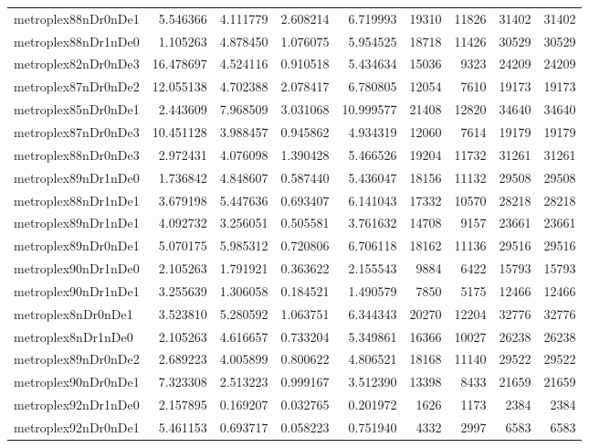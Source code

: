 \begin{longtable}{|l|r|r|r|r|r|r|r|r|}
metroplex88nDr0nDe1 & 5.546366 & 4.111779 & 2.608214 & 6.719993 & 19310 & 11826 & 31402 & 31402 \\
metroplex88nDr1nDe0 & 1.105263 & 4.878450 & 1.076075 & 5.954525 & 18718 & 11426 & 30529 & 30529 \\
metroplex82nDr0nDe3 & 16.478697 & 4.524116 & 0.910518 & 5.434634 & 15036 & 9323 & 24209 & 24209 \\
metroplex87nDr0nDe2 & 12.055138 & 4.702388 & 2.078417 & 6.780805 & 12054 & 7610 & 19173 & 19173 \\
metroplex85nDr0nDe1 & 2.443609 & 7.968509 & 3.031068 & 10.999577 & 21408 & 12820 & 34640 & 34640 \\
metroplex87nDr0nDe3 & 10.451128 & 3.988457 & 0.945862 & 4.934319 & 12060 & 7614 & 19179 & 19179 \\
metroplex88nDr0nDe3 & 2.972431 & 4.076098 & 1.390428 & 5.466526 & 19204 & 11732 & 31261 & 31261 \\
metroplex89nDr1nDe0 & 1.736842 & 4.848607 & 0.587440 & 5.436047 & 18156 & 11132 & 29508 & 29508 \\
metroplex88nDr1nDe1 & 3.679198 & 5.447636 & 0.693407 & 6.141043 & 17332 & 10570 & 28218 & 28218 \\
metroplex89nDr1nDe1 & 4.092732 & 3.256051 & 0.505581 & 3.761632 & 14708 & 9157 & 23661 & 23661 \\
metroplex89nDr0nDe1 & 5.070175 & 5.985312 & 0.720806 & 6.706118 & 18162 & 11136 & 29516 & 29516 \\
metroplex90nDr1nDe0 & 2.105263 & 1.791921 & 0.363622 & 2.155543 & 9884 & 6422 & 15793 & 15793 \\
metroplex90nDr1nDe1 & 3.255639 & 1.306058 & 0.184521 & 1.490579 & 7850 & 5175 & 12466 & 12466 \\
metroplex8nDr0nDe1 & 3.523810 & 5.280592 & 1.063751 & 6.344343 & 20270 & 12204 & 32776 & 32776 \\
metroplex8nDr1nDe0 & 2.105263 & 4.616657 & 0.733204 & 5.349861 & 16366 & 10027 & 26238 & 26238 \\
metroplex89nDr0nDe2 & 2.689223 & 4.005899 & 0.800622 & 4.806521 & 18168 & 11140 & 29522 & 29522 \\
metroplex90nDr0nDe1 & 7.323308 & 2.513223 & 0.999167 & 3.512390 & 13398 & 8433 & 21659 & 21659 \\
metroplex92nDr1nDe0 & 2.157895 & 0.169207 & 0.032765 & 0.201972 & 1626 & 1173 & 2384 & 2384 \\
metroplex92nDr0nDe1 & 5.461153 & 0.693717 & 0.058223 & 0.751940 & 4332 & 2997 & 6583 & 6583 \\

\end{longtable}
